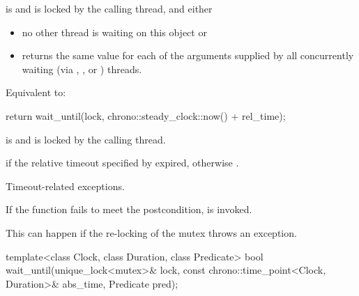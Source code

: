 \begin{itemdescr}
\pnum
\expects
{} is  and 
is locked by the calling thread, and either
\begin{itemize}
\item no other thread is waiting on this  object or
\item {} returns the same value for each of the  arguments
supplied by all concurrently waiting (via , , or
) threads.
\end{itemize}

\pnum
\effects
Equivalent to:
\begin{codeblock}
return wait_until(lock, chrono::steady_clock::now() + rel_time);
\end{codeblock}

\pnum
\ensures
{} is  and 
is locked by the calling thread.

\pnum
\returns
{} if
the relative timeout specified by  expired,
otherwise .

\pnum
\throws
Timeout-related
exceptions.

\pnum
\remarks
If the function fails to meet the postcondition, 
is invoked.
\begin{note}
This can happen if the re-locking of the mutex throws an exception.
\end{note}
\end{itemdescr}

%
\begin{itemdecl}
template<class Clock, class Duration, class Predicate>
  bool wait_until(unique_lock<mutex>& lock,
                  const chrono::time_point<Clock, Duration>& abs_time,
                  Predicate pred);
\end{itemdecl}

